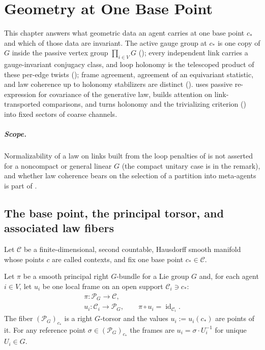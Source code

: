 \chapter{Geometry at One Base Point}
\label{ch:geometry}

This chapter answers what geometric data an agent carries at one base point $c_*$ and which of those
data are invariant. The active gauge group at $c_*$ is one copy of $G$ inside the passive vertex group
$\prod_{i\in V}G$ (); every independent link carries a
gauge-invariant conjugacy class, and loop holonomy is the telescoped product of these per-edge twists
(); frame agreement, agreement of an equivariant statistic, and
law coherence up to holonomy stabilizers are distinct ().
 uses passive re-expression for covariance of the generative law,
 builds attention on link-transported comparisons, and
 turns holonomy and the trivializing criterion
() into fixed sectors of coarse channels.

\paragraph{Scope.}
Normalizability of a law on links built from the loop penalties of  is
not asserted for a noncompact or general linear $G$ (the compact unitary case is in the remark), and
whether law coherence bears on the selection of a partition into meta-agents is part of
. 

\section{The base point, the principal torsor, and associated law fibers}
\label{sec:geo-base}
\label{sec:geo-bundle}
\label{sec:geo-associated}

Let $\mathcal C$ be a finite-dimensional, second countable, Hausdorff smooth manifold whose points
$c$ are called contexts, and fix one base point $c_*\in\mathcal C$.

Let $\pi$ be a smooth principal right $G$-bundle for a Lie group $G$ and, for each agent $i\in V$,
let $u_i$ be one local frame on an open support $\mathcal C_i\ni c_*$:
\begin{gather}
\pi:\mathscr P_G\longrightarrow\mathcal C,
\label{eq:geo-principal-bundle}\\
u_i:\mathcal C_i\longrightarrow\mathscr P_G,
\qquad
\pi\circ u_i=\operatorname{id}_{\mathcal C_i}.
\label{eq:geo-frame-sections}
\end{gather}
The fiber $(\mathscr P_G)_{c_*}$ is a right $G$-torsor and the values $u_i:=u_i(c_*)$ are points of
it. For any reference point $\sigma\in(\mathscr P_G)_{c_*}$ the frames are
$u_i=\sigma\cdot U_i^{-1}$ for unique $U_i\in G$.


